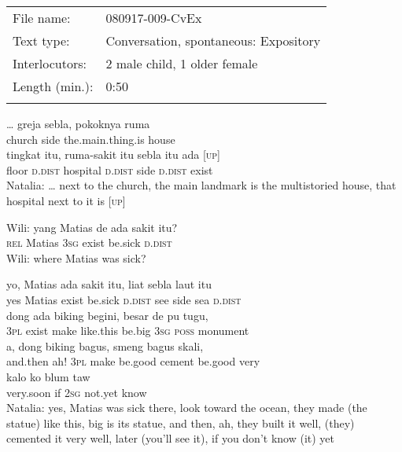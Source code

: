 \begin{tabular}{ll}
\lsptoprule
File name: &  080917-009-CvEx\\
Text type: &  Conversation, spontaneous: Expository\\
Interlocutors: &  2 male child, 1 older female\\
Length (min.): &  0:50\\
\lspbottomrule
\end{tabular}
\setcounter{equation}{0}
\ea
{}  {\ldots}    {greja}    {sebla,}    {pokoknya}    {ruma}\\
   {}  {}    {church}    {side}    {the.main.thing.is}    {house}\\
\gll tingkat    {itu,}    {ruma-sakit}    {itu}   sebla    {itu}   ada   {\upshape\textsc{[up]}}\\
  floor    {\textsc{d.dist}}    {hospital}    {\textsc{d.dist}}   side    {\textsc{d.dist}}   exist   \\
 Natalia: {\ldots} next to the church, the main landmark is the multistoried house, that hospital next to it is [\textsc{up}]
\z

\ea
\gll   Wili:   yang   Matias   de   ada   sakit   itu?\\
{}  \textsc{rel}   Matias   \textsc{3sg}   exist   be.sick   \textsc{d.dist}\\
\glt
Wili: where Matias was sick?
\z

\ea
{}    {yo,}    {Matias}    {ada}    {sakit}    {itu,}    {liat}    {sebla}    {laut}   itu\\
   {}    {yes}    {Matias}    {exist}    {be.sick}    {\textsc{d.dist}}    {see}    {side}    {sea}   \textsc{d.dist}\\
\gll dong    {ada}    {biking}    {begini,}    {besar}    {de}    {pu}    {tugu,}\\
  \textsc{3pl}    {exist}    {make}    {like.this}    {be.big}    {\textsc{3sg}}    {\textsc{poss}}    {monument}\\
    {a,}    {dong}    {biking}    {bagus,}    {smeng}    {bagus}    {skali,}\\
   {and.then}    {ah!}    {\textsc{3pl}}    {make}    {be.good}    {cement}    {be.good}    {very}\\
    {kalo}    {ko}    {blum}    {taw}\\
   {very.soon}    {if}    {\textsc{2sg}}    {not.yet}    {know}\\
\glt
Natalia: yes, Matias was sick there, look toward the ocean, they made (the statue) like this, big is its statue, and then, ah, they built it well, (they) cemented it very well, later (you’ll see it), if you don’t know (it) yet
\z

